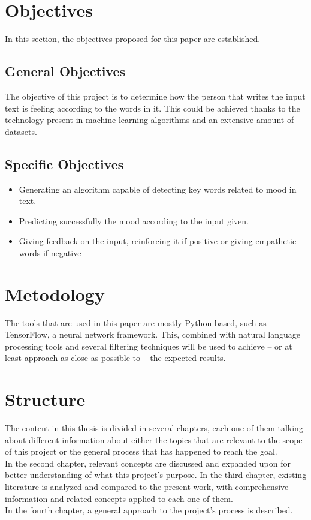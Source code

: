 \section{Objectives}
In this section, the objectives proposed for this paper are established.

\subsection{General Objectives}
The objective of this project is to determine how the person that writes the input text is feeling according to the words in it. This could be achieved thanks to the technology present in machine learning algorithms and an extensive amount of datasets.

\subsection{Specific Objectives}
\begin{itemize}
	\item Generating an algorithm capable of detecting key words related to mood in text.
	\item Predicting successfully the mood according to the input given.
	\item Giving feedback on the input, reinforcing it if positive or giving empathetic words if negative
\end{itemize}

\section{Metodology}
The tools that are used in this paper are mostly Python-based, such as TensorFlow, a neural network framework. This, combined with natural language processing tools and several filtering techniques will be used to achieve -- or at least approach as close as possible to -- the expected results.

\section{Structure}
The content in this thesis is divided in several chapters, each one of them talking about different information about either the topics that are relevant to the scope of this project or the general process that has happened to reach the goal.\\
In the second chapter, relevant concepts are discussed and expanded upon for better understanding of what this project's purpose.
In the third chapter, existing literature is analyzed and compared to the present work, with comprehensive information and related concepts applied to each one of them.\\
In the fourth chapter, a general approach to the project's process is described.
\clearpage
